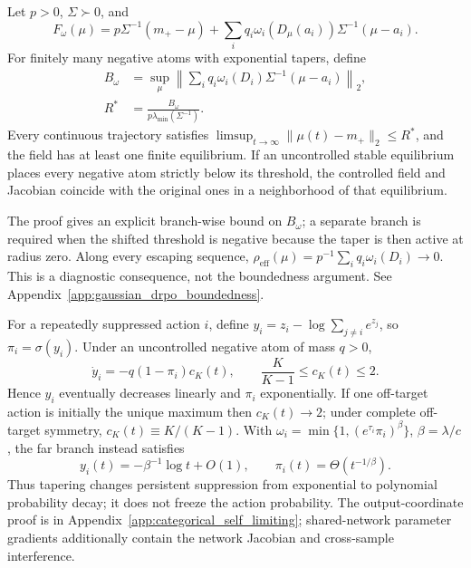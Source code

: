 \begin{theorem}
\label{thm:gaussian_drpo_boundedness}
Let \(p>0\), \(\Sigma\succ0\), and
\[
F_\omega(\mu)=p\Sigma^{-1}(m_+-\mu)
+\sum_iq_i\omega_i(D_\mu(a_i))\Sigma^{-1}(\mu-a_i).
\]
For finitely many negative atoms with exponential tapers, define
\begin{equation}
\begin{aligned}
B_\omega&=\sup_\mu\left\|\sum_iq_i\omega_i(D_i)
\Sigma^{-1}(\mu-a_i)\right\|_2,\\
R^*&=\frac{B_\omega}{p\lambda_{\min}(\Sigma^{-1})}.
\end{aligned}
\label{eq:gaussian_bound_radius}
\end{equation}
Every continuous trajectory satisfies
\(\limsup_{t\to\infty}\|\mu(t)-m_+\|_2\le R^*\), and the field has at
least one finite equilibrium. If an uncontrolled stable equilibrium
places every negative atom strictly below its threshold, the controlled
field and Jacobian coincide with the original ones in a neighborhood of
that equilibrium.
\end{theorem}

The proof gives an explicit branch-wise bound on \(B_\omega\); a separate
branch is required when the shifted threshold is negative because the taper is
then active at radius zero. Along every escaping sequence,
\(\rho_{\mathrm{eff}}(\mu)=p^{-1}\sum_iq_i\omega_i(D_i)\to0\). This is a
diagnostic consequence, not the boundedness argument. See
Appendix~\ref{app:gaussian_drpo_boundedness}.

\begin{theorem}
\label{thm:categorical_self_limiting}
For a repeatedly suppressed action \(i\), define
\(y_i=z_i-\log\sum_{j\ne i}e^{z_j}\), so \(\pi_i=\sigma(y_i)\).
Under an uncontrolled negative atom of mass \(q>0\),
\[
\dot y_i=-q(1-\pi_i)c_K(t),
\qquad \frac K{K-1}\le c_K(t)\le2.
\]
Hence \(y_i\) eventually decreases linearly and \(\pi_i\) exponentially.
If one off-target action is initially the unique maximum then
\(c_K(t)\to2\); under complete off-target symmetry,
\(c_K(t)\equiv K/(K-1)\). With
\(\omega_i=\min\{1,(e^{\tau_i}\pi_i)^\beta\}\), \(\beta=\lambda/c\),
the far branch instead satisfies
\[
y_i(t)=-\beta^{-1}\log t+O(1),
\qquad \pi_i(t)=\Theta(t^{-1/\beta}).
\]
Thus tapering changes persistent suppression from exponential to
polynomial probability decay; it does not freeze the action probability.
The output-coordinate proof is in
Appendix~\ref{app:categorical_self_limiting}; shared-network parameter
gradients additionally contain the network Jacobian and cross-sample
interference.
\end{theorem}

